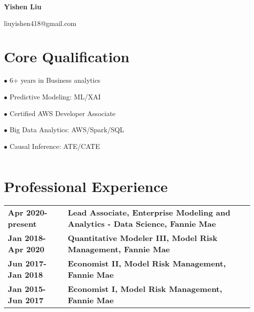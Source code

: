 \documentclass[letterpaper]{article}
\makeatletter
\def\name{Yishen Liu}
\def\email{liuyishen418@gmail.com}
\renewenvironment{itemize}{
  \begin{list}{}{
    \setlength{\leftmargin}{1.5em}
  }
}{
  \end{list}
}
\makeatother
\begin{document}

\centerline{\huge \bf \name}
\vspace{0.1in}
\centerline{\email}

\vspace{0.25in}

\noindent\makebox[\linewidth]{\rule{0.8\paperwidth}{0.5pt}}

\section*{Core Qualification}

\begin{itemize}
\begin{minipage}{0.4\linewidth}
    \item[$\bullet$] 6+ years in Business analytics
    \item[$\bullet$] Predictive Modeling: ML/XAI
    \item[$\bullet$] Certified AWS Developer Associate 
\end{minipage}
\begin{minipage}{0.4\linewidth}
    \item[$\bullet$] Big Data Analytics: AWS/Spark/SQL
    \item[$\bullet$] Causal Inference: ATE/CATE
    \item[$$] \;
\end{minipage}
\end{itemize}


\section*{Professional Experience}
\begin{tabular}{ll}
 {\bfseries Apr 2020- present}  & {\bfseries Lead Associate, Enterprise Modeling and Analytics - Data Science, Fannie Mae} \\ 
 {\bfseries Jan 2018- Apr 2020}  & {\bfseries Quantitative Modeler III, Model Risk Management, Fannie Mae} \\
 {\bfseries Jun 2017- Jan 2018} & {\bfseries Economist II, Model Risk Management, Fannie Mae} \\
 {\bfseries Jan 2015- Jun 2017} & {\bfseries Economist I, Model Risk Management, Fannie Mae} \\
 
\end{tabular}
\end{document}
